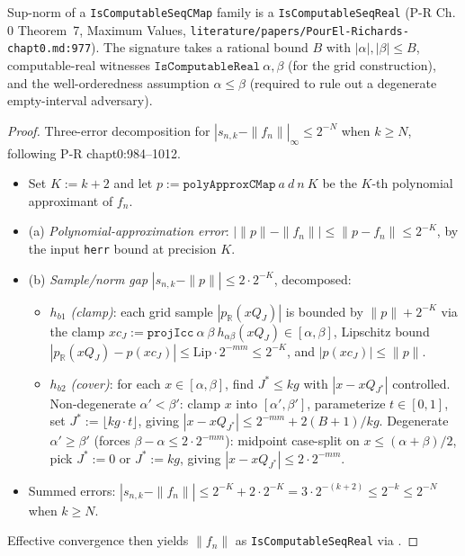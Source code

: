 \begin{lemma}
  \label{lem:l4_cmap_axiom3}
  \leanok
  Sup-norm of a \texttt{IsComputableSeqCMap} family is a \texttt{IsComputableSeqReal} (P-R Ch.\,0 Theorem~7, Maximum Values, \texttt{literature/papers/PourEl-Richards-chapt0.md:977}). The signature takes a rational bound $B$ with $|\alpha|, |\beta| \le B$, computable-real witnesses $\texttt{IsComputableReal}~\alpha, \beta$ (for the grid construction), and the well-orderedness assumption $\alpha \le \beta$ (required to rule out a degenerate empty-interval adversary).
\end{lemma}
\begin{proof}
  \leanok
  Three-error decomposition for $|s_{n,k} - \|f_n\||_\infty \le 2^{-N}$ when $k \ge N$, following P-R chapt0:984--1012.
  \begin{itemize}
    \item Set $K := k + 2$ and let $p := \texttt{polyApproxCMap}~a~d~n~K$ be the $K$-th polynomial approximant of $f_n$.
    \item (a) \emph{Polynomial-approximation error}: $|\|p\| - \|f_n\|| \le \|p - f_n\| \le 2^{-K}$, by the input \texttt{herr} bound at precision $K$.
    \item (b) \emph{Sample/norm gap} $|s_{n,k} - \|p\|| \le 2 \cdot 2^{-K}$, decomposed:
      \begin{itemize}
        \item \emph{$h_{b1}$ (clamp)}: each grid sample $|p_\mathbb{R}(xQ_J)|$ is bounded by $\|p\| + 2^{-K}$ via the clamp $xc_J := \mathtt{projIcc}~\alpha~\beta~h_{\alpha\beta}(xQ_J) \in [\alpha,\beta]$, Lipschitz bound $|p_\mathbb{R}(xQ_J) - p(xc_J)| \le \mathrm{Lip} \cdot 2^{-mm} \le 2^{-K}$, and $|p(xc_J)| \le \|p\|$.
        \item \emph{$h_{b2}$ (cover)}: for each $x \in [\alpha,\beta]$, find $J^* \le kg$ with $|x - xQ_{J^*}|$ controlled. Non-degenerate $\alpha' < \beta'$: clamp $x$ into $[\alpha',\beta']$, parameterize $t \in [0,1]$, set $J^* := \lfloor kg \cdot t \rfloor$, giving $|x - xQ_{J^*}| \le 2^{-mm} + 2(B+1)/kg$. Degenerate $\alpha' \ge \beta'$ (forces $\beta - \alpha \le 2 \cdot 2^{-mm}$): midpoint case-split on $x \le (\alpha+\beta)/2$, pick $J^* := 0$ or $J^* := kg$, giving $|x - xQ_{J^*}| \le 2 \cdot 2^{-mm}$.
      \end{itemize}
    \item Summed errors: $|s_{n,k} - \|f_n\|| \le 2^{-K} + 2 \cdot 2^{-K} = 3 \cdot 2^{-(k+2)} \le 2^{-k} \le 2^{-N}$ when $k \ge N$.
  \end{itemize}
  Effective convergence then yields $\|f_n\|$ as \texttt{IsComputableSeqReal} via .
\end{proof}

